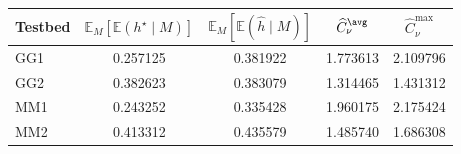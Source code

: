 \begin{tabular}{lcccc}
\toprule
Testbed & $\mathbb E_M[\mathbb E(h^\star\mid M)]$ & $\mathbb E_M[\mathbb E(\hat h\mid M)]$ & $\widehat C_\nu^{\avg}$ & $\widehat C_\nu^{\max}$ \\
\midrule
GG1 & 0.257125 & 0.381922 & 1.773613 & 2.109796 \\
GG2 & 0.382623 & 0.383079 & 1.314465 & 1.431312 \\
MM1 & 0.243252 & 0.335428 & 1.960175 & 2.175424 \\
MM2 & 0.413312 & 0.435579 & 1.485740 & 1.686308 \\
\bottomrule
\end{tabular}